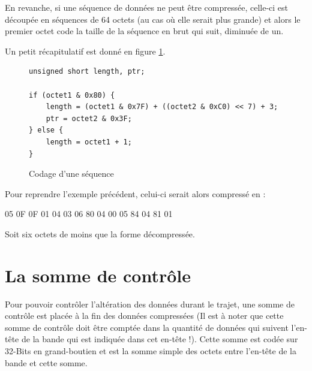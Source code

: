 En revanche, si une séquence de données ne peut être compressée, celle-ci
est découpée en séquences de 64 octets (au cas où elle serait plus grande)
et alors le premier octet code la taille de la séquence en brut qui suit,
diminuée de un.

Un petit récapitulatif est donné en figure \ref{fig:code_comp}.
\begin{figure}[!ht]
\centering
\begin{verbatim}
unsigned short length, ptr;

if (octet1 & 0x80) {
    length = (octet1 & 0x7F) + ((octet2 & 0xC0) << 7) + 3;
    ptr = octet2 & 0x3F;
} else {
    length = octet1 + 1;
}
\end{verbatim}
\caption{Codage d'une séquence}
\label{fig:code_comp}
\end{figure}

Pour reprendre l'exemple précédent, celui-ci serait alors compressé en :
\begin{exemple}
05 0F 0F 01 04 03 06 80 04 00 05 84 04 81 01
\end{exemple}

Soit six octets de moins que la forme décompressée.

\section{La somme de contrôle}
Pour pouvoir contrôler l'altération des données durant le trajet, une somme de
contrôle est placée à la fin des données compressées (Il est à noter que cette
somme de contrôle doit être comptée dans la quantité de données qui suivent
l'en-tête de la bande qui est indiquée dans cet en-tête !). Cette somme est
codée sur 32-Bits en grand-boutien et est la somme simple des octets entre
l'en-tête de la bande et cette somme.